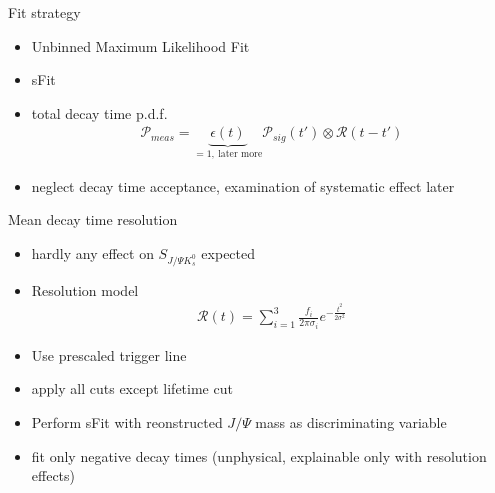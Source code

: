 \documentclass{beamer}
\newcommand{\SJPsi}{S_{J/\Psi K_s^0}}
\begin{document}
	\begin{frame}{Fit strategy}
	\begin{itemize}
	\item Unbinned Maximum Likelihood Fit
	\item sFit
	\item total decay time p.d.f.
	\begin{align}
	\mathcal{P}_{meas} = \underbrace{\epsilon(t)}_{= 1,\ \text{later more}}\mathcal{P}_{sig}(t') \otimes \mathcal{R}(t-t')
	\end{align}
	\item neglect decay time acceptance, examination of systematic effect later
	\end{itemize}
	\end{frame}
	
	\begin{frame}{Mean decay time resolution}
	\begin{itemize}
    \item hardly any effect on $\SJPsi$ expected
	\item Resolution model
	\begin{align}
	\mathcal{R}(t) = \sum_{i=1}^3 \frac{f_i}{2\pi\sigma_i}e^{-\tfrac{t^2}{2\sigma^2}}
	\end{align}
	\item Use prescaled trigger line
	\item apply all cuts except lifetime cut
	\item Perform sFit with reonstructed $J/\Psi$ mass as discriminating variable
	\item fit only negative decay times (unphysical, explainable only with resolution effects)
	\end{itemize}
	\end{frame}
	
\end{document}

